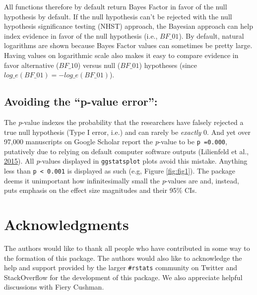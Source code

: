 \documentclass[
]{article}
\begin{document}
All functions therefore by default return Bayes Factor
in favor of the null hypothesis by default. If the null hypothesis can't be
rejected with the null hypothesis significance testing (NHST) approach, the
Bayesian approach can help index evidence in favor of the null hypothesis (i.e.,
\(BF\_{01}\)). By default, natural logarithms are shown because Bayes Factor
values can sometimes be pretty large. Having values on logarithmic scale also
makes it easy to compare evidence in favor alternative (\(BF\_{10}\)) versus null
(\(BF\_{01}\)) hypotheses (since \(log\_{e}(BF\_{01}) = - log\_{e}(BF\_{01})\)).

\hypertarget{avoiding-the-p-value-error}{%
\subsection{\texorpdfstring{Avoiding the \textbf{``p-value error''}:}{Avoiding the ``p-value error'':}}\label{avoiding-the-p-value-error}}

The \emph{p}-value indexes the probability that the researchers have falsely rejected
a true null hypothesis (Type I error, i.e.) and can rarely be \emph{exactly} 0. And
yet over 97,000 manuscripts on Google Scholar report the \emph{p}-value to be \texttt{p\ =0.000},
putatively due to relying on default computer software outputs
(Lilienfeld et al., \protect\hyperlink{ref-lilienfeldFiftyPsychologicalPsychiatric2015}{2015}). All \emph{p}-values displayed in
\texttt{ggstatsplot} plots avoid this mistake. Anything less than \texttt{p\ \textless{}\ 0.001} is
displayed as such (e.g, Figure \ref{fig:fig1}). The package deems it unimportant how
infinitesimally small the \emph{p}-values are and, instead, puts emphasis on the
effect size magnitudes and their 95\% CIs.

\newpage

\hypertarget{acknowledgments}{%
\section{Acknowledgments}\label{acknowledgments}}

The authors would like to thank all people who have contributed in some way to
the formation of this package. The authors would also like to acknowledge the
help and support provided by the larger \texttt{\#rstats} community on Twitter and
StackOverflow for the development of this package. We also appreciate helpful
discussions with Fiery Cushman.

\newpage
\end{document}
